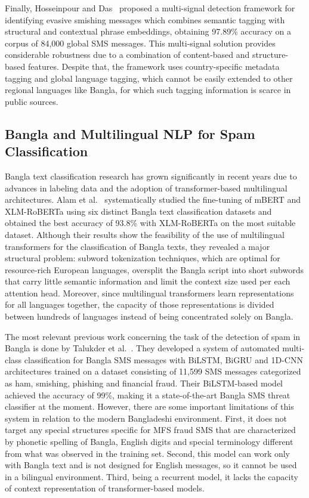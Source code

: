 \documentclass[journal]{IEEEtran}
\begin{document}
Finally, Hosseinpour and Das~\cite{ref10} proposed a multi-signal detection
framework for identifying evasive smishing messages which combines
semantic tagging with structural and contextual phrase embeddings,
obtaining 97.89\% accuracy on a corpus of 84,000 global SMS messages.
This multi-signal solution provides considerable robustness due to a
combination of content-based and structure-based features. Despite that,
the framework uses country-specific metadata tagging and global language
tagging, which cannot be easily extended to other regional languages
like Bangla, for which such tagging information is scarce in public
sources.

\subsection{Bangla and Multilingual NLP for Spam Classification}

Bangla text classification research has grown significantly in recent
years due to advances in labeling data and the adoption of
transformer-based multilingual architectures. Alam et al.~\cite{ref4}
systematically studied the fine-tuning of mBERT and XLM-RoBERTa using
six distinct Bangla text classification datasets and obtained the best
accuracy of 93.8\% with XLM-RoBERTa on the most suitable dataset.
Although their results show the feasibility of the use of multilingual
transformers for the classification of Bangla texts, they revealed a
major structural problem: subword tokenization techniques, which are
optimal for resource-rich European languages, oversplit the Bangla
script into short subwords that carry little semantic information and
limit the context size used per each attention head. Moreover, since
multilingual transformers learn representations for all languages
together, the capacity of those representations is divided between
hundreds of languages instead of being concentrated solely on Bangla.

The most relevant previous work concerning the task of the detection of
spam in Bangla is done by Talukder et al.~\cite{ref7}. They developed a system
of automated multi-class classification for Bangla SMS messages with
BiLSTM, BiGRU and 1D-CNN architectures trained on a dataset consisting
of 11,599 SMS messages categorized as ham, smishing, phishing and
financial fraud. Their BiLSTM-based model achieved the accuracy of 99\%,
making it a state-of-the-art Bangla SMS threat classifier at the moment.
However, there are some important limitations of this system in relation
to the modern Bangladeshi environment. First, it does not target any
special structures specific for MFS fraud SMS that are characterized by
phonetic spelling of Bangla, English digits and special terminology
different from what was observed in the training set. Second, this model
can work only with Bangla text and is not designed for English messages,
so it cannot be used in a bilingual environment. Third, being a
recurrent model, it lacks the capacity of context representation of
transformer-based models.
\end{document}
